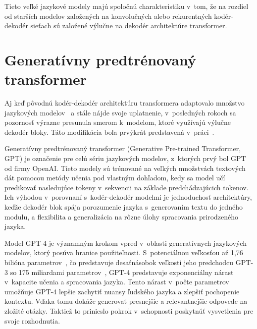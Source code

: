 Tieto veľké jazykové modely majú spoločnú charakteristiku v~tom, že na rozdiel od starších modelov založených na konvolučných alebo rekurentných kodér-dekodér sieťach sú založené výlučne na dekodér architektúre transformer.

\section{Generatívny predtrénovaný transformer}

Aj keď pôvodnú kodér-dekodér architektúru transformera adaptovalo množstvo jazykových modelov~\cite{raffel2023exploring,lewis2019bart} a stále nájde svoje uplatnenie, v~posledných rokoch sa pozornosť výrazne presunula smerom k~modelom, ktoré využívajú výlučne dekodér bloky. Táto modifikácia bola prvýkrát predstavená  v~práci~\cite{liu2018generating}.

Generatívny predtrénovaný transformer (Generative Pre-trained Transformer, GPT) je označenie pre celú sériu jazykových modelov, z~ktorých prvý bol GPT~\cite{radford2018improving} od firmy OpenAI. Tieto modely sú trénované na veľkých množstvách textových dát pomocou metódy učenia pod vlastným dohľadom, kedy sa model učí predikovať nasledujúce tokeny v~sekvencii na základe predchádzajúcich tokenov. Ich výhodou v~porovnaní s~kodér-dekodér modelmi je jednoduchosť architektúry, keďže dekodér blok spája porozumenie jazyka s~generovaním textu do jedného modulu, a flexibilita a generalizácia na rôzne úlohy spracovania prirodzeného jazyka.

Model GPT-4 je významným krokom vpred v~oblasti generatívnych jazykových modelov, ktorý posúva hranice použiteľnosti. S~potenciálnou veľkosťou až 1,76 bilióna parametrov~\cite{gtp4leaked}, čo predstavuje desaťnásobok veľkosti jeho predchodcu GPT-3 so 175 miliardami parametrov~\cite{brown2020language}, GPT-4 predstavuje exponenciálny nárast v~kapacite učenia a spracovania jazyka. Tento nárast v~počte parametrov umožňuje GPT-4 lepšie zachytiť nuansy ľudského jazyka a zlepšiť pochopenie kontextu. Vďaka tomu dokáže generovať presnejšie a relevantnejšie odpovede na zložité otázky. Taktiež to prinieslo pokrok v~schopnosti poskytnúť vysvetlenia pre svoje rozhodnutia.

